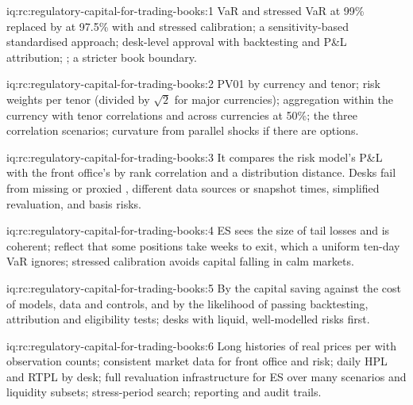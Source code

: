 \begin{solution}{iq:rc:regulatory-capital-for-trading-books:1}
VaR and stressed VaR at 99\% replaced by  at 97.5\% with  and stressed
calibration; a sensitivity-based standardised approach; desk-level approval with backtesting and
P\&L attribution; ; a stricter book boundary.
\end{solution}

\begin{solution}{iq:rc:regulatory-capital-for-trading-books:2}
PV01 by currency and tenor; risk weights per tenor (divided by $\sqrt2$ for major currencies);
aggregation within the currency with tenor correlations and across currencies at 50\%; the three
correlation scenarios; curvature from parallel shocks if there are options.
\end{solution}

\begin{solution}{iq:rc:regulatory-capital-for-trading-books:3}
It compares the risk model's P\&L with the front office's by rank correlation and a distribution
distance. Desks fail from missing or proxied , different data sources or snapshot times,
simplified revaluation, and basis risks.
\end{solution}

\begin{solution}{iq:rc:regulatory-capital-for-trading-books:4}
ES sees the size of tail losses and is coherent;  reflect that some positions take
weeks to exit, which a uniform ten-day VaR ignores; stressed calibration avoids capital falling in calm
markets.
\end{solution}

\begin{solution}{iq:rc:regulatory-capital-for-trading-books:5}
By the capital saving against the cost of models, data and controls, and by the likelihood of passing
backtesting, attribution and eligibility tests; desks with liquid, well-modelled risks first.
\end{solution}

\begin{solution}{iq:rc:regulatory-capital-for-trading-books:6}
Long histories of real prices per  with observation counts; consistent market data for
front office and risk; daily HPL and RTPL by desk; full revaluation infrastructure for ES over many
scenarios and liquidity subsets; stress-period search; reporting and audit trails.
\end{solution}
